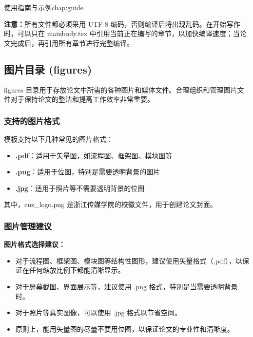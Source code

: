 \begin{cuzchapter}{使用指南与示例}{chap:guide}
    \begin{leftbar}
        \noindent\textbf{注意：}所有文件都必须采用 UTF-8 编码，否则编译后将出现乱码。在开始写作时，可以只在 mainbody.tex 中引用当前正在编写的章节，以加快编译速度；当论文完成后，再引用所有章节进行完整编译。
    \end{leftbar}

    \subsection{图片目录 (figures)}\label{sub:figures}

    figures 目录用于存放论文中所需的各种图片和媒体文件。合理组织和管理图片文件对于保持论文的整洁和提高工作效率非常重要。

    \subsubsection{支持的图片格式}\label{subsub:image-formats}

    模板支持以下几种常见的图片格式：
    \begin{itemize}
        \item \textbf{.pdf}：适用于矢量图，如流程图、框架图、模块图等
        \item \textbf{.png}：适用于位图，特别是需要透明背景的图片
        \item \textbf{.jpg}：适用于照片等不需要透明背景的位图
    \end{itemize}

    其中，cuz\_logo.png 是浙江传媒学院的校徽文件，用于创建论文封面。

    \subsubsection{图片管理建议}\label{subsub:image-management}

    \begin{leftbar}
        \noindent\textbf{图片格式选择建议：}
        \begin{itemize}
            \item 对于流程图、框架图、模块图等结构性图形，建议使用矢量格式（.pdf），以保证在任何缩放比例下都能清晰显示。
            \item 对于屏幕截图、界面展示等，建议使用 .png 格式，特别是当需要透明背景时。
            \item 对于照片等真实图像，可以使用 .jpg 格式以节省空间。
            \item 原则上，能用矢量图的尽量不要用位图，以保证论文的专业性和清晰度。
        \end{itemize}


\end{leftbar}
\end{cuzchapter}
